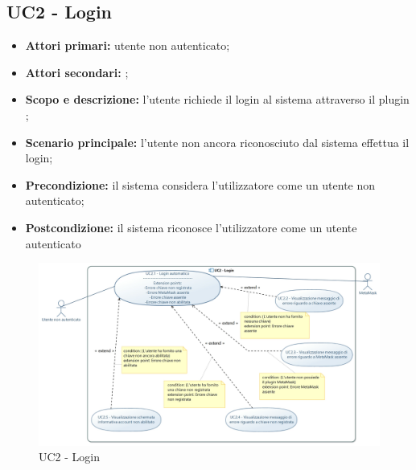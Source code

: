 \documentclass[AnalisiDeiRequisiti.tex]{subfiles}
\begin{document}
\subsection{UC2 - Login}
\begin{itemize}
	\item \textbf{Attori primari:} utente non autenticato;
	\item \textbf{Attori secondari:} ;
	\item \textbf{Scopo e descrizione:} l'utente richiede il login al sistema attraverso il plugin ;
	\item \textbf{Scenario principale:} l'utente non ancora riconosciuto dal sistema effettua il login;
	\item \textbf{Precondizione:} il sistema considera l'utilizzatore come un utente non autenticato;
	\item \textbf{Postcondizione:} il sistema riconosce l'utilizzatore come un utente autenticato\\
\end{itemize}

\begin{figure}[H]
	\centering
	\includegraphics[width=1.0\linewidth]{UC2.jpg}
	\caption{UC2 - Login}
	\label{fig:UC2 - Login}
\end{figure}
\end{document}
